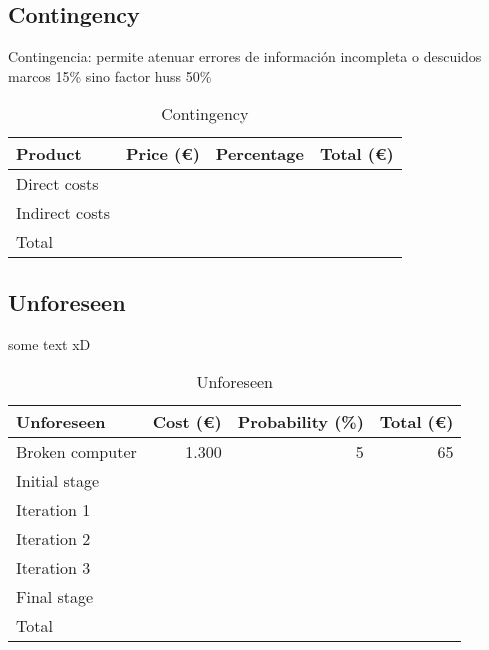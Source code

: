\subsection{Contingency}
Contingencia: permite atenuar errores de información incompleta o descuidos\\
marcos 15\% sino factor huss 50\%
\begin{table}[h!]
	\centering
	\begin{tabular}{|l|r|r|r|}
		\hline
		\multicolumn{1}{|l|}{Product} & \multicolumn{1}{l|}{Price (€)} & \multicolumn{1}{l|}{Percentage} & \multicolumn{1}{l|}{Total (€)} \\ \hline
		Direct costs                  &                                &                                 &                                \\ \hline
		Indirect costs                &                                &                                 &                                \\ \hline\hline
		Total                         & \multicolumn{3}{r|}{}                                                                             \\ \hline
	\end{tabular}
	\caption{Contingency}
	\label{Contingency}
\end{table}

\subsection{Unforeseen}
some text xD
\begin{table}[h!]
	\centering
	\begin{tabular}{|l|r|r|r|}
		\hline
		Unforeseen      & \multicolumn{1}{l|}{Cost (€)} & \multicolumn{1}{l|}{Probability (\%)} & \multicolumn{1}{l|}{Total (€)} \\ \hline
		Broken computer & 1.300                         & 5                                     & 65                             \\ \hline
		Initial stage   &                               &                                       &                                \\ \hline
		Iteration 1     &                               &                                       &                                \\ \hline
		Iteration 2     &                               &                                       &                                \\ \hline
		Iteration 3     &                               &                                       &                                \\ \hline
		Final stage     &                               &                                       &                          \\ \hline\hline
		Total           & \multicolumn{3}{r|}{}                                                                                  \\ \hline
	\end{tabular}
	\caption{Unforeseen}
	\label{Unforeseen}
\end{table}


